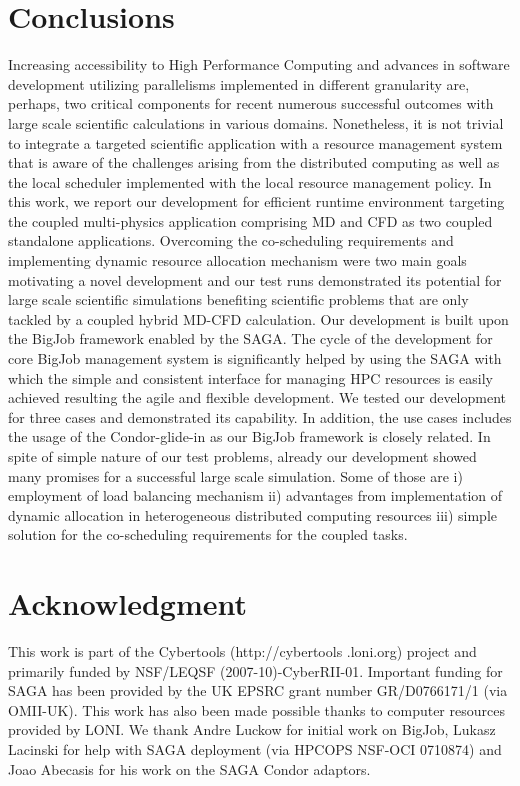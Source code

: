 \documentclass[conference,final]{IEEEtran}
\begin{document}
\section{Conclusions}
Increasing accessibility to High Performance Computing and advances in software development utilizing parallelisms implemented in different granularity are, perhaps, two critical components for recent numerous successful outcomes with large scale scientific calculations in various domains. Nonetheless, it is not trivial to integrate a targeted scientific application with a resource management system that is aware of the challenges arising from the distributed computing as well as the local scheduler implemented with the local resource management policy.  
In this work, we report our development for efficient runtime environment targeting the coupled multi-physics application comprising MD and CFD as two coupled standalone applications.  Overcoming the co-scheduling requirements and implementing dynamic resource allocation mechanism were two main goals motivating a novel development and our test runs demonstrated its potential for large scale scientific simulations benefiting scientific problems that are only tackled by a coupled hybrid MD-CFD calculation.
Our development is built upon the BigJob framework enabled by the SAGA.  The cycle of the development for core BigJob management system is significantly helped by using the SAGA with which the simple and consistent interface for managing HPC resources is easily achieved resulting the agile and flexible development.
We tested our development for three cases and demonstrated its capability.  In addition, the use cases includes the usage of the Condor-glide-in as our BigJob framework is closely related.  In spite of simple nature of our test problems, already our development showed many promises for a successful large scale simulation.  Some of those are i) employment of load balancing mechanism ii) advantages from implementation of dynamic allocation in heterogeneous distributed computing resources iii) simple solution for the co-scheduling requirements for the coupled tasks.

\section*{Acknowledgment}
This work is part of the Cybertools (http://cybertools .loni.org) project and primarily funded by NSF/LEQSF (2007-10)-CyberRII-01. Important funding for SAGA has been provided by the UK EPSRC grant number GR/D0766171/1 (via OMII-UK).  This work has also been made possible thanks to computer resources provided by LONI.  We thank Andre Luckow for initial work on BigJob, Lukasz Lacinski for help with SAGA deployment (via HPCOPS NSF-OCI 0710874) and Joao Abecasis for his work on the SAGA Condor adaptors.

\nocite{ex1,ex2}
%


\end{document}
